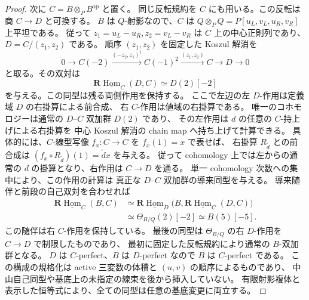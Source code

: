 \begin{proof}
次に $C=B\otimes_PB^{\mathrm{op}}$ と置く。
同じ反転規約を $C$ にも用いる。この反転は商 $C\to D$ と可換する。
$B$ は $Q$-射影なので、$C$ は
$Q\otimes_P Q=P[u_L,v_L,u_R,v_R]$ 上平坦である。
従って $z_1=u_L-u_R,z_2=v_L-v_R$ は $C$ 上の中心正則列であり、
$D=C/(z_1,z_2)$ である。
順序 $(z_1,z_2)$ を固定した Koszul 解消を
\[
 0\longrightarrow C(-2)\xrightarrow{(-z_2,z_1)^{\mathrm t}}
 C(-1)^2\xrightarrow{(z_1,z_2)}C\longrightarrow D\longrightarrow0
\]
と取る。その双対は
\[
 \mathbf R\underline{\operatorname{Hom}}_C(D,C)\simeq D(2)[-2]
\]
を与える。この同型は残る両側作用を保持する。
ここで左辺の左 $D$-作用は定義域 $D$ の右掛算による前合成、
右 $C$-作用は値域の右掛算である。
唯一のコホモロジーは通常の $D$--$C$ 双加群 $D(2)$ であり、
その左作用は $d$ の任意の $C$-持上げによる右掛算を
中心 Koszul 解消の chain map へ持ち上げて計算できる。
具体的には、$C$-線型写像 $f_x:C\to C$ を $f_x(1)=x$ で表せば、
右掛算 $R_{\widetilde d}$ との前合成は
$(f_x\circ R_{\widetilde d})(1)=\widetilde d x$ を与える。
従って cohomology 上では左からの通常の $d$ の掛算となり、右作用は $C\to D$ を通る。
単一 cohomology 次数への集中により、この作用の計算は
真正な $D$--$C$ 双加群の導来同型を与える。
導来随伴と前段の自己双対を合わせれば
\begin{align*}
 \mathbf R\underline{\operatorname{Hom}}_C(B,C)
 &\simeq
 \mathbf R\underline{\operatorname{Hom}}_D
   \bigl(B,\mathbf R\underline{\operatorname{Hom}}_C(D,C)\bigr)\\
 &\simeq\Theta_{B/Q}(2)[-2]
 \simeq B(5)[-5].
\end{align*}
この随伴は右 $C$-作用を保持している。
最後の同型は $\Theta_{B/Q}$ の右 $D$-作用を $C\to D$ で制限したものであり、
最初に固定した反転規約により通常の $B$-双加群となる。
$D$ は $C$-perfect、$B$ は $D$-perfect なので $B$ は $C$-perfect である。
この構成の規格化は active 三変数の体積と $(u,v)$ の順序によるものであり、
中山自己同型や基底上の未指定の線束を後から挿入していない。
有限射影複体と表示した恒等式により、全ての同型は任意の基底変更に両立する。


\end{proof}
